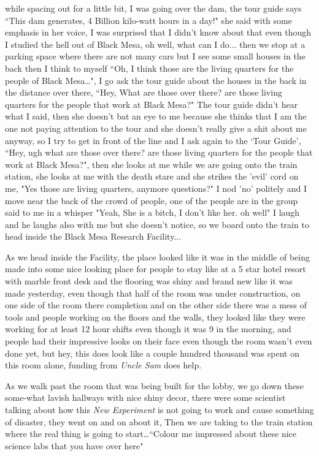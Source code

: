 \documentclass[14pt,letterpaper]{book}
\begin{document}
while spacing out for a little bit, I was going over the dam, the tour guide says ``This dam generates, 4 Billion kilo-watt hours in a day!" she said with some emphasis in her voice, I was surprised that I didn't know about that even though I studied the hell out of Black Mesa, oh well, what can I do... then we stop at a parking space where there are not many cars but I see some small houses in the back then I think to myself ``Oh, I think those are the living quarters for the people of Black Mesa\ldots", I go ask the tour guide about the houses in the back in the distance over there, ``Hey, What are those over there? are those living quarters for the people that work at Black Mesa?" The tour guide didn't hear what I said, then she doesn't bat an eye to me because she thinks that I am the one not paying attention to the tour and she doesn't really give a shit about me anyway, so I try to get in front of the line and I ask again to the `Tour Guide', ``Hey, ugh what are those over there? are those living quarters for the people that work at Black Mesa?", then she looks at me while we are going onto the train station, she looks at me with the death stare and she strikes the 'evil' cord on me, "Yes those are living quarters, anymore questions?" I nod 'no' politely and I move near the back of the crowd of people, one of the people are in the group said to me in a whisper "Yeah, She is a bitch, I don't like her. oh well" I laugh and he laughs also with me but she doesn't notice, so we board onto the train to head inside the Black Mesa Research Facility...

As we head inside the Facility, the place looked like it was in the middle of being made into some nice looking place for people to stay like at a 5 star hotel resort with marble front desk and the flooring was shiny and brand new like it was made yesterday, even though that half of the room was under construction, on one side of the room there completion and on the other side there was a mess of tools and people working on the floors and the walls, they looked like they were working for at least 12 hour shifts even though it was 9 in the morning, and people had their impressive looks on their face even though the room wasn't even done yet, but hey, this does look like a couple hundred thousand was spent on this room alone, funding from \textit{Uncle Sam} does help.

As we walk past the room that was being built for the lobby, we go down these some-what lavish hallways with nice shiny decor, there were some scientist talking about how this \textit{New Experiment} is not going to work and cause something of disaster, they went on and on about it, Then we are taking to the train station where the real thing is going to start\ldots ``Colour me impressed about these nice science labs that you have over here"
\end{document}
